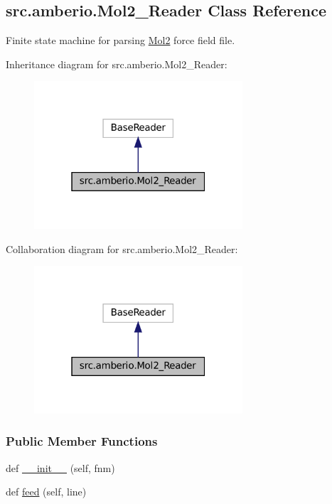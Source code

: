 \hypertarget{classsrc_1_1amberio_1_1Mol2__Reader}{}\subsection{src.\+amberio.\+Mol2\+\_\+\+Reader Class Reference}
\label{classsrc_1_1amberio_1_1Mol2__Reader}


Finite state machine for parsing \hyperlink{namespacesrc_1_1Mol2}{Mol2} force field file.  




Inheritance diagram for src.\+amberio.\+Mol2\+\_\+\+Reader\+:
\nopagebreak
\begin{figure}[H]
\begin{center}
\leavevmode
\includegraphics[width=220pt]{classsrc_1_1amberio_1_1Mol2__Reader__inherit__graph}
\end{center}
\end{figure}


Collaboration diagram for src.\+amberio.\+Mol2\+\_\+\+Reader\+:
\nopagebreak
\begin{figure}[H]
\begin{center}
\leavevmode
\includegraphics[width=220pt]{classsrc_1_1amberio_1_1Mol2__Reader__coll__graph}
\end{center}
\end{figure}
\subsubsection*{Public Member Functions}
\begin{DoxyCompactItemize}
\item 
def \hyperlink{classsrc_1_1amberio_1_1Mol2__Reader_a8ad64cfe46a30caa9cbc89473b9e72b5}{\+\_\+\+\_\+init\+\_\+\+\_\+} (self, fnm)
\item 
def \hyperlink{classsrc_1_1amberio_1_1Mol2__Reader_a1c4c0c9d26152464dcb3a45498f3417e}{feed} (self, line)
\end{DoxyCompactItemize}
